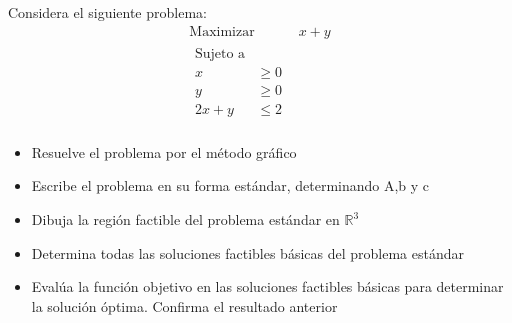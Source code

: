 \documentclass{article}
\begin{document}
Considera el siguiente problema:
\begin{equation*}
  \begin{aligned}
    \text{Maximizar}\quad & x+y\\
    \begin{aligned}
      \text{Sujeto a}& \quad\\
      x & \geq 0\\
      y & \geq 0\\
      2x+y & \leq 2\\
    \end{aligned}
    \end{aligned}
  \end{equation*}
  \begin{itemize}
  \item Resuelve el problema por el método gráfico
  \item Escribe el problema en su forma estándar, determinando A,b y c
  \item Dibuja la región factible del problema estándar en $\mathbb{R}^3$
  \item Determina todas las soluciones factibles básicas del problema estándar
  \item Evalúa la función objetivo en las soluciones factibles básicas para determinar la solución óptima. Confirma el resultado anterior 
  \end{itemize}
\end{document}

